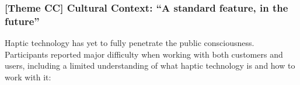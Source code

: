 

\subsubsection{\textbf{[Theme CC]} Cultural Context: ``A standard feature, in the future''}
\label{sec:interviews:culture}
\noindent Haptic technology has yet to fully penetrate the public consciousness.
Participants reported major difficulty when working with both customers 
and users, including a limited understanding of what haptic technology is and how to work with it: %


